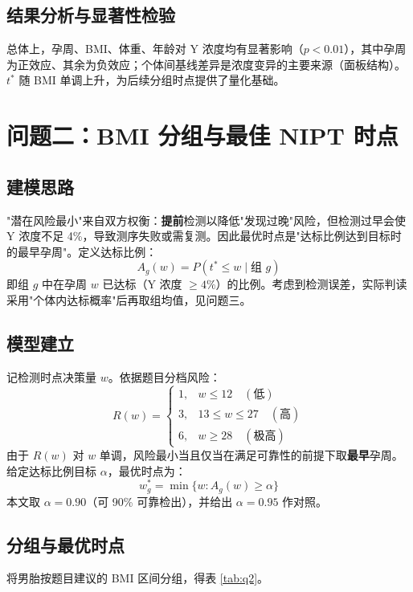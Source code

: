 \documentclass[12pt,a4paper]{article}
\begin{document}
\subsection{结果分析与显著性检验}
总体上，孕周、BMI、体重、年龄对 Y 浓度均有显著影响（$p<0.01$），其中孕周为正效应、其余为负效应；个体间基线差异是浓度变异的主要来源（面板结构）。$t^*$ 随 BMI 单调上升，为后续分组时点提供了量化基础。

\section{问题二：BMI 分组与最佳 NIPT 时点}
\subsection{建模思路}
"潜在风险最小"来自双方权衡：\textbf{提前}检测以降低"发现过晚"风险，但检测过早会使 Y 浓度不足 4\%，导致测序失败或需复测。因此最优时点是"达标比例达到目标时的最早孕周"。定义达标比例：
\begin{equation}
A_g(w)=P(t^*\leq w \mid \text{组 }g)
\end{equation}
即组 $g$ 中在孕周 $w$ 已达标（Y 浓度 $\geq4\%$）的比例。考虑到检测误差，实际判读采用"个体内达标概率"后再取组均值，见问题三。

\subsection{模型建立}
记检测时点决策量 $w$。依据题目分档风险：
\begin{equation}
R(w)=\begin{cases}
1, & w\leq 12 \quad(\text{低})\\
3, & 13\leq w\leq 27 \quad(\text{高})\\
6, & w\geq 28 \quad(\text{极高})
\end{cases}
\end{equation}
由于 $R(w)$ 对 $w$ 单调，风险最小当且仅当在满足可靠性的前提下取\textbf{最早}孕周。给定达标比例目标 $\alpha$，最优时点为：
\begin{equation}
w^*_g=\min\{w: A_g(w)\geq \alpha\}
\end{equation}
本文取 $\alpha=0.90$（可 90\% 可靠检出），并给出 $\alpha=0.95$ 作对照。

\subsection{分组与最优时点}
将男胎按题目建议的 BMI 区间分组，得表 \ref{tab:q2}。
\end{document}
